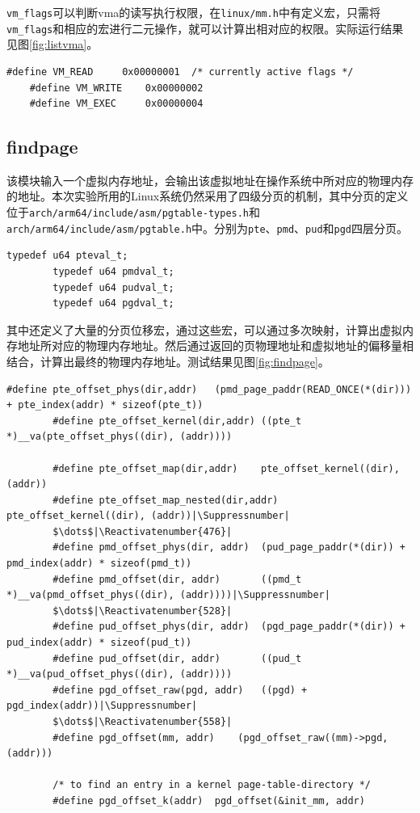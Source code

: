 \documentclass[UTF8]{ctexrep}
\makeatletter
\let\origthelstnumber\thelstnumber
\newcommand*\Suppressnumber{%
  \lst@AddToHook{OnNewLine}{%
    \let\thelstnumber\relax%
     \advance\c@lstnumber-\@ne\relax%
    }%
}
\newcommand*\Reactivatenumber[1]{%
  \setcounter{lstnumber}{\numexpr#1-1\relax}
  \lst@AddToHook{OnNewLine}{%
   \let\thelstnumber\origthelstnumber%
   \refstepcounter{lstnumber}
  }%
}
\makeatother
\begin{document}
    \texttt{vm\_flags}可以判断vma的读写执行权限，在\texttt{linux/mm.h}中有定义宏，只需将\texttt{vm\_flags}和相应的宏进行二元操作，就可以计算出相对应的权限。实际运行结果见图\ref{fig:listvma}。

    \begin{lstlisting}[firstnumber=172]
    #define VM_READ		0x00000001	/* currently active flags */
    #define VM_WRITE	0x00000002
    #define VM_EXEC		0x00000004
    \end{lstlisting}

    \subsection{findpage}

    该模块输入一个虚拟内存地址，会输出该虚拟地址在操作系统中所对应的物理内存的地址。本次实验所用的Linux系统仍然采用了四级分页的机制，其中分页的定义位于\texttt{arch/arm64/include/asm/pgtable-types.h}和\texttt{arch/arm64/include/asm/pgtable.h}中。分别为\texttt{pte}、\texttt{pmd}、\texttt{pud}和\texttt{pgd}四层分页。

    \begin{lstlisting}[firstnumber=25]
        typedef u64 pteval_t;
        typedef u64 pmdval_t;
        typedef u64 pudval_t;
        typedef u64 pgdval_t;
    \end{lstlisting}

    其中还定义了大量的分页位移宏，通过这些宏，可以通过多次映射，计算出虚拟内存地址所对应的物理内存地址。然后通过返回的页物理地址和虚拟地址的偏移量相结合，计算出最终的物理内存地址。测试结果见图\ref{fig:findpage}。

    \begin{lstlisting}[firstnumber=425]
        #define pte_offset_phys(dir,addr)	(pmd_page_paddr(READ_ONCE(*(dir))) + pte_index(addr) * sizeof(pte_t))
        #define pte_offset_kernel(dir,addr)	((pte_t *)__va(pte_offset_phys((dir), (addr))))

        #define pte_offset_map(dir,addr)	pte_offset_kernel((dir), (addr))
        #define pte_offset_map_nested(dir,addr)	pte_offset_kernel((dir), (addr))|\Suppressnumber|
        $\dots$|\Reactivatenumber{476}|
        #define pmd_offset_phys(dir, addr)	(pud_page_paddr(*(dir)) + pmd_index(addr) * sizeof(pmd_t))
        #define pmd_offset(dir, addr)		((pmd_t *)__va(pmd_offset_phys((dir), (addr))))|\Suppressnumber|
        $\dots$|\Reactivatenumber{528}|
        #define pud_offset_phys(dir, addr)	(pgd_page_paddr(*(dir)) + pud_index(addr) * sizeof(pud_t))
        #define pud_offset(dir, addr)		((pud_t *)__va(pud_offset_phys((dir), (addr))))
        #define pgd_offset_raw(pgd, addr)	((pgd) + pgd_index(addr))|\Suppressnumber|
        $\dots$|\Reactivatenumber{558}|
        #define pgd_offset(mm, addr)	(pgd_offset_raw((mm)->pgd, (addr)))

        /* to find an entry in a kernel page-table-directory */
        #define pgd_offset_k(addr)	pgd_offset(&init_mm, addr)

    \end{lstlisting}
\end{document}
